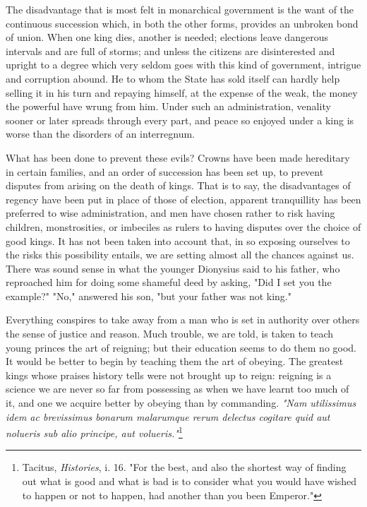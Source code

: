 \documentclass[12pt]{book}
\begin{document}
The disadvantage that is most felt in monarchical government is the want of the continuous succession which, in both the other forms, provides an unbroken bond of union. When one king dies, another is needed; elections leave dangerous intervals and are full of storms; and unless the citizens are disinterested and upright to a degree which very seldom goes with this kind of government, intrigue and corruption abound. He to whom the State has sold itself can hardly help selling it in his turn and repaying himself, at the expense of the weak, the money the powerful have wrung from him. Under such an administration, venality sooner or later spreads through every part, and peace so enjoyed under a king is worse than the disorders of an interregnum.

What has been done to prevent these evils? Crowns have been made hereditary in certain families, and an order of succession has been set up, to prevent disputes from arising on the death of kings. That is to say, the disadvantages of regency have been put in place of those of election, apparent tranquillity has been preferred to wise administration, and men have chosen rather to risk having children, monstrosities, or imbeciles as rulers to having disputes over the choice of good kings. It has not been taken into account that, in so exposing ourselves to the risks this possibility entails, we are setting almost all the chances against us. There was sound sense in what the younger Dionysius said to his father, who reproached him for doing some shameful deed by asking, "Did I set you the example?" "No," answered his son, "but your father was not king."

Everything conspires to take away from a man who is set in authority over others the sense of justice and reason. Much trouble, we are told, is taken to teach young princes the art of reigning; but their education seems to do them no good. It would be better to begin by teaching them the art of obeying. The greatest kings whose praises history tells were not brought up to reign: reigning is a science we are never so far from possessing as when we have learnt too much of it, and one we acquire better by obeying than by commanding. \textit{"Nam utilissimus idem ac brevissimus bonarum malarumque rerum delectus cogitare quid aut nolueris sub alio principe, aut volueris."}\footnote{Tacitus, \textit{Histories}, i. 16. "For the best, and also the shortest way of finding out what is good and what is bad is to consider what you would have wished to happen or not to happen, had another than you been Emperor."}
\end{document}
